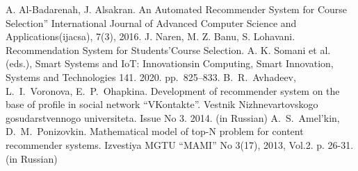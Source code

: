 \documentclass[conference,a4]{IEEEtran}
\begin{document}
\begin{thebibliography}{99}
A. Al-Badarenah, J. Alsakran. An Automated Recommender System for Course Selection” International Journal of Advanced Computer Science and Applications(ijacsa), 7(3), 2016. 
J. Naren, M. Z. Banu, S. Lohavani. Recommendation System for Students’Course Selection. A. K. Somani et al. (eds.), Smart Systems and IoT: Innovationsin Computing, Smart Innovation, Systems and Technologies 141. 2020. pp.~825--833. 
 B.~R.~Avhadeev, L.~I.~Voronova, E.~P.~Ohapkina. Development of recommender system on the base of profile in social network ``VKontakte''. Vestnik Nizhnevartovskogo gosudarstvennogo universiteta. Issue No 3. 2014. (in Russian)
A.~S.~Amel'kin, D.~M.~Ponizovkin. Mathematical model of top-N problem for content recommender systems. Izvestiya MGTU ``MAMI'' No 3(17), 2013, Vol.2. p. 26-31. (in Russian)
\end{thebibliography}
\end{document}
